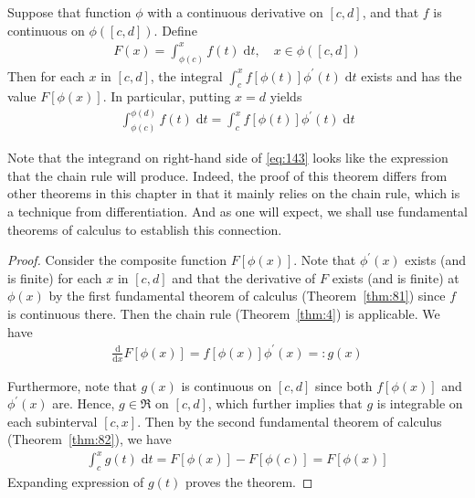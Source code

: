 \documentclass[thmcnt=section, 12pt]{my-elegantbook}
\begin{document}
\begin{theorem} \label{thm:83}
	Suppose that function $\phi$
	with a continuous derivative on $[c, d]$,
	and that $f$ is continuous on $\phi([c, d])$.
	Define 
	\begin{align*}
		F(x) = \int_{\phi(c)}^x f(t) \; \mathrm{d} t,
		\quad x \in \phi([c, d])
	\end{align*}
	Then for each $x$ in $[c, d]$, the integral
	$\int_{c}^x f[\phi(t)] \phi^\prime(t) \; \mathrm{d} t$
	exists and has the value $F[ \phi(x) ]$.
	In particular, putting $x = d$ yields
	\begin{align}
		\int_{\phi(c)}^{\phi(d)} f(t) \; \mathrm{d} t
		= \int_{c}^x f[\phi(t)] \phi^\prime(t) \; \mathrm{d} t
		\label{eq:143}
	\end{align}
\end{theorem}

Note that the integrand on right-hand side of \eqref{eq:143}
looks like the expression that the chain rule will produce.
Indeed, the proof of this theorem
differs from other theorems in this chapter in that 
it mainly relies on the chain rule, 
which is a technique from differentiation. 
And as one will expect, 
we shall use fundamental theorems of calculus
to establish this connection.

\begin{proof}
	Consider the composite function $F[\phi(x)]$.
	Note that $\phi^\prime(x)$ exists (and is finite) 
	for each $x$ in $[c,d]$ 
	and that the derivative of $F$ exists (and is finite) 
	at $\phi(x)$
	by the first fundamental theorem of calculus (Theorem~\ref{thm:81})
	since $f$ is continuous there.
	Then the chain rule (Theorem~\ref{thm:4}) is applicable.
	We have 
	\begin{align*}
		\frac{ \mathrm{d} }{ \mathrm{d} x } F[\phi(x)]
		= f[ \phi(x) ] \phi^\prime(x)
		=: g(x)
	\end{align*}
	
	Furthermore, note that $g(x)$ is continuous on $[c, d]$
	since both $f[\phi(x)]$ and $\phi^\prime(x)$ are.
	Hence, $g \in \mathfrak{R}$ on $[c, d]$, 
	which further implies that $g$ is integrable 
	on each subinterval $[c, x]$.
	Then by the second fundamental theorem of calculus 
	(Theorem~\ref{thm:82}),
	we have 
	\begin{align*}
		\int_c^x g(t) \; \mathrm{d} t
		= F[\phi(x)] - F[\phi(c)]
		= F[\phi(x)]
	\end{align*}
	Expanding expression of $g(t)$ proves the theorem.
\end{proof}
\end{document}
